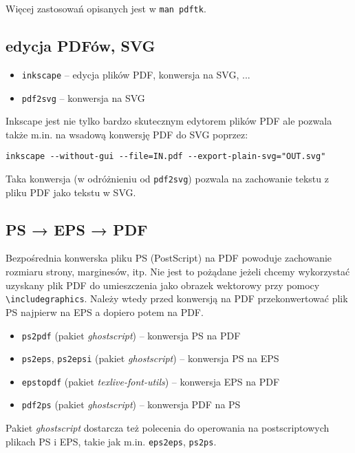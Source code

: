 \documentclass[fontSize=10pt, rmargin=3cm, extra]{pdfArticle}
\begin{document}
Więcej zastosowań opisanych jest w \Verb$man pdftk$.


\subsection{edycja PDFów, SVG}

\begin{itemize}
	\item \Verb$inkscape$ – edycja plików PDF, konwersja na SVG, ...
	\item \Verb$pdf2svg$ – konwersja na SVG
\end{itemize}

Inkscape jest nie tylko bardzo skutecznym edytorem plików PDF ale pozwala także m.in. na wsadową konwersję PDF do SVG poprzez:
\begin{verbatim}
inkscape --without-gui --file=IN.pdf --export-plain-svg="OUT.svg"
\end{verbatim}
Taka konwersja (w odróżnieniu od \Verb$pdf2svg$) pozwala na zachowanie tekstu z pliku PDF jako tekstu w SVG.

\subsection{PS → EPS → PDF}

Bezpośrednia konwerska pliku PS (PostScript) na PDF powoduje zachowanie rozmiaru strony, marginesów, itp.
Nie jest to pożądane jeżeli chcemy wykorzystać uzyskany plik PDF do umieszczenia jako obrazek wektorowy przy pomocy \Verb$\includegraphics$.
Należy wtedy przed konwersją na PDF przekonwertować plik PS najpierw na EPS a dopiero potem na PDF.

\begin{itemize}
	\item \Verb$ps2pdf$ (pakiet \textit{ghostscript}) – konwersja PS na PDF
	\item \Verb$ps2eps$, \Verb$ps2epsi$ (pakiet \textit{ghostscript}) – konwersja PS na EPS
	\item \Verb$epstopdf$ (pakiet \textit{texlive-font-utils}) – konwersja EPS na PDF
	\item \Verb$pdf2ps$ (pakiet \textit{ghostscript}) – konwersja PDF na PS
\end{itemize}

Pakiet \textit{ghostscript} dostarcza też polecenia do operowania na postscriptowych plikach PS i EPS, takie jak m.in. \Verb$eps2eps$, \Verb$ps2ps$.

\end{document}
